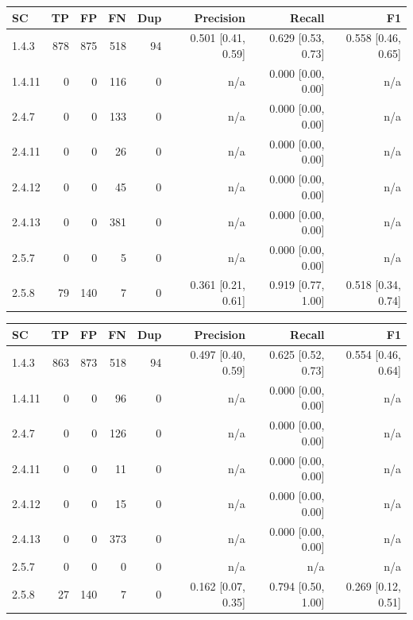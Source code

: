 \begin{tabular}{lrrrrrrr}
\hline
SC & TP & FP & FN & Dup & Precision & Recall & F1 \\
\hline
1.4.3 & 878 & 875 & 518 & 94 & 0.501 [0.41, 0.59] & 0.629 [0.53, 0.73] & 0.558 [0.46, 0.65] \\
1.4.11 & 0 & 0 & 116 & 0 & n/a & 0.000 [0.00, 0.00] & n/a \\
2.4.7 & 0 & 0 & 133 & 0 & n/a & 0.000 [0.00, 0.00] & n/a \\
2.4.11 & 0 & 0 & 26 & 0 & n/a & 0.000 [0.00, 0.00] & n/a \\
2.4.12 & 0 & 0 & 45 & 0 & n/a & 0.000 [0.00, 0.00] & n/a \\
2.4.13 & 0 & 0 & 381 & 0 & n/a & 0.000 [0.00, 0.00] & n/a \\
2.5.7 & 0 & 0 & 5 & 0 & n/a & 0.000 [0.00, 0.00] & n/a \\
2.5.8 & 79 & 140 & 7 & 0 & 0.361 [0.21, 0.61] & 0.919 [0.77, 1.00] & 0.518 [0.34, 0.74] \\
\hline
\end{tabular}

\begin{tabular}{lrrrrrrr}
\hline
SC & TP & FP & FN & Dup & Precision & Recall & F1 \\
\hline
1.4.3 & 863 & 873 & 518 & 94 & 0.497 [0.40, 0.59] & 0.625 [0.52, 0.73] & 0.554 [0.46, 0.64] \\
1.4.11 & 0 & 0 & 96 & 0 & n/a & 0.000 [0.00, 0.00] & n/a \\
2.4.7 & 0 & 0 & 126 & 0 & n/a & 0.000 [0.00, 0.00] & n/a \\
2.4.11 & 0 & 0 & 11 & 0 & n/a & 0.000 [0.00, 0.00] & n/a \\
2.4.12 & 0 & 0 & 15 & 0 & n/a & 0.000 [0.00, 0.00] & n/a \\
2.4.13 & 0 & 0 & 373 & 0 & n/a & 0.000 [0.00, 0.00] & n/a \\
2.5.7 & 0 & 0 & 0 & 0 & n/a & n/a & n/a \\
2.5.8 & 27 & 140 & 7 & 0 & 0.162 [0.07, 0.35] & 0.794 [0.50, 1.00] & 0.269 [0.12, 0.51] \\
\hline
\end{tabular}


